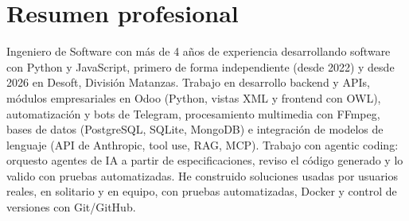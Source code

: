\section{Resumen profesional}

Ingeniero de Software con más de 4 años de experiencia desarrollando software con Python y JavaScript, primero de forma independiente (desde 2022) y desde 2026 en Desoft, División Matanzas. Trabajo en desarrollo backend y APIs, módulos empresariales en Odoo (Python, vistas XML y frontend con OWL), automatización y bots de Telegram, procesamiento multimedia con FFmpeg, bases de datos (PostgreSQL, SQLite, MongoDB) e integración de modelos de lenguaje (API de Anthropic, tool use, RAG, MCP). Trabajo con agentic coding: orquesto agentes de IA a partir de especificaciones, reviso el código generado y lo valido con pruebas automatizadas. He construido soluciones usadas por usuarios reales, en solitario y en equipo, con pruebas automatizadas, Docker y control de versiones con Git/GitHub.

